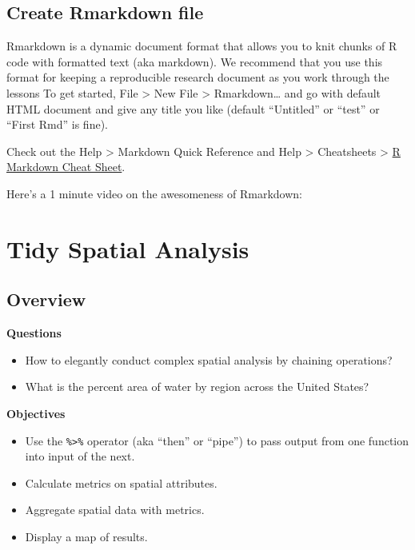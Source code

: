 \documentclass[]{book}
\providecommand{\tightlist}{%
  \setlength{\itemsep}{0pt}\setlength{\parskip}{0pt}}
\theoremstyle{definition}
\theoremstyle{definition}
\theoremstyle{definition}
\theoremstyle{remark}
\begin{document}
\section{Create Rmarkdown file}\label{create-rmarkdown-file}

Rmarkdown is a dynamic document format that allows you to knit chunks of
R code with formatted text (aka markdown). We recommend that you use
this format for keeping a reproducible research document as you work
through the lessons To get started, File \textgreater{} New File
\textgreater{} Rmarkdown\ldots{} and go with default HTML document and
give any title you like (default ``Untitled'' or ``test'' or ``First
Rmd'' is fine).

Check out the Help \textgreater{} Markdown Quick Reference and Help
\textgreater{} Cheatsheets \textgreater{}
\href{https://github.com/rstudio/cheatsheets/raw/master/rmarkdown-2.0.pdf}{R
Markdown Cheat Sheet}.

Here's a 1 minute video on the awesomeness of Rmarkdown:

\chapter{Tidy Spatial Analysis}\label{tidy}

\section{Overview}\label{overview}

\textbf{Questions}

\begin{itemize}
\tightlist
\item
  How to elegantly conduct complex spatial analysis by chaining
  operations?
\item
  What is the percent area of water by region across the United States?
\end{itemize}

\textbf{Objectives}

\begin{itemize}
\tightlist
\item
  Use the \texttt{\%\textgreater{}\%} operator (aka ``then'' or
  ``pipe'') to pass output from one function into input of the next.
\item
  Calculate metrics on spatial attributes.
\item
  Aggregate spatial data with metrics.
\item
  Display a map of results.
\end{itemize}
\end{document}
